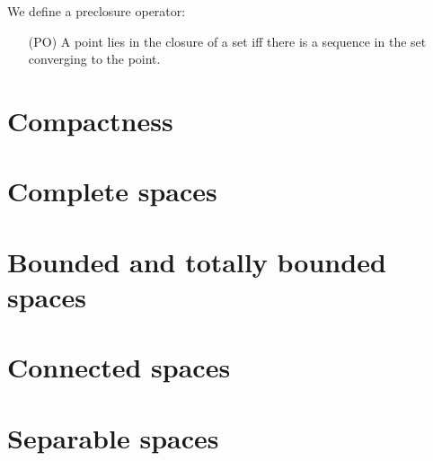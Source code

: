 We define a preclosure operator:
\begin{enumerate}
	\item[(PO)] A point lies in the closure of a set iff there is a sequence in the set converging to the point.
\end{enumerate}

\section{Compactness}

\section{Complete spaces}

\section{Bounded and totally bounded spaces}

\section{Connected spaces}

\section{Separable spaces}
